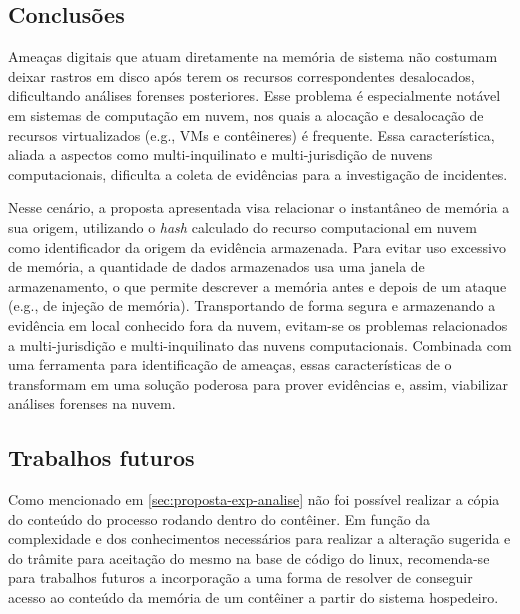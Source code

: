 \subsection{Conclusões}
\label{sec:proposta-concl}

%
Ameaças digitais que atuam diretamente na memória de sistema não costumam deixar rastros em disco após terem os recursos correspondentes desalocados, dificultando análises forenses posteriores.
%
Esse problema é especialmente notável em sistemas de computação em nuvem, nos quais a alocação e desalocação de recursos virtualizados (e.g., VMs e contêineres) é frequente.
%
Essa característica, aliada a aspectos como multi-inquilinato e multi-jurisdição de nuvens computacionais, dificulta a coleta de evidências para a investigação de incidentes.

%
Nesse cenário, a proposta apresentada visa relacionar o instantâneo de memória a sua origem, utilizando o \textit{hash} calculado do recurso computacional em nuvem como identificador da origem da evidência armazenada.
%
Para evitar uso excessivo de memória, a quantidade de dados armazenados usa uma janela de armazenamento, o que permite descrever a memória antes e depois de um ataque (e.g., de injeção de memória). 
%
Transportando de forma segura e armazenando a evidência em local conhecido fora da nuvem, evitam-se os problemas relacionados a multi-jurisdição e multi-inquilinato das nuvens computacionais.
%
Combinada com uma ferramenta para identificação de ameaças, essas características de \fancyname o transformam em uma solução poderosa para prover evidências e, assim, viabilizar análises forenses na nuvem.


\subsection{Trabalhos futuros}
\label{sec:proposta-trab-fut}

%
Como mencionado em \ref{sec:proposta-exp-analise} não foi possível realizar a cópia do conteúdo do processo rodando dentro do contêiner. 
%
Em função da complexidade e dos conhecimentos necessários para realizar a alteração sugerida e do trâmite para aceitação do mesmo na base de código do linux, recomenda-se para trabalhos futuros a incorporação a \fancyname uma forma de resolver de conseguir acesso ao conteúdo da memória de um contêiner a partir do sistema hospedeiro.

